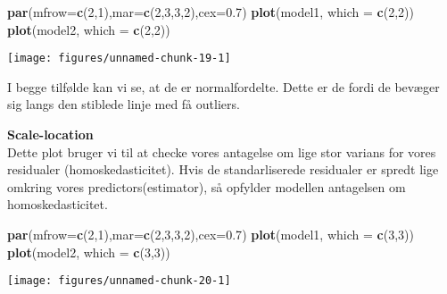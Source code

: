 \documentclass[
  10pt,
]{article}
\newenvironment{Shaded}{\begin{snugshade}}{\end{snugshade}}
\newcommand{\DataTypeTok}[1]{\textcolor[rgb]{0.13,0.29,0.53}{#1}}
\newcommand{\DecValTok}[1]{\textcolor[rgb]{0.00,0.00,0.81}{#1}}
\newcommand{\FloatTok}[1]{\textcolor[rgb]{0.00,0.00,0.81}{#1}}
\newcommand{\KeywordTok}[1]{\textcolor[rgb]{0.13,0.29,0.53}{\textbf{#1}}}
\newcommand{\NormalTok}[1]{#1}
\begin{document}
\begin{Shaded}
\begin{Highlighting}[]
\KeywordTok{par}\NormalTok{(}\DataTypeTok{mfrow=}\KeywordTok{c}\NormalTok{(}\DecValTok{2}\NormalTok{,}\DecValTok{1}\NormalTok{),}\DataTypeTok{mar=}\KeywordTok{c}\NormalTok{(}\DecValTok{2}\NormalTok{,}\DecValTok{3}\NormalTok{,}\DecValTok{3}\NormalTok{,}\DecValTok{2}\NormalTok{),}\DataTypeTok{cex=}\FloatTok{0.7}\NormalTok{)}
\KeywordTok{plot}\NormalTok{(model1, }\DataTypeTok{which =} \KeywordTok{c}\NormalTok{(}\DecValTok{2}\NormalTok{,}\DecValTok{2}\NormalTok{))}
\KeywordTok{plot}\NormalTok{(model2, }\DataTypeTok{which =} \KeywordTok{c}\NormalTok{(}\DecValTok{2}\NormalTok{,}\DecValTok{2}\NormalTok{))}
\end{Highlighting}
\end{Shaded}

\begin{center}\texttt{[image: figures/unnamed-chunk-19-1]} \end{center}

I begge tilfølde kan vi se, at de er normalfordelte. Dette er de fordi
de bevæger sig langs den stiblede linje med få outliers. \newpage

\textbf{Scale-location}\\
Dette plot bruger vi til at checke vores antagelse om lige stor varians
for vores residualer (homoskedasticitet). Hvis de standarliserede
residualer er spredt lige omkring vores predictors(estimator), så
opfylder modellen antagelsen om homoskedasticitet.

\begin{Shaded}
\begin{Highlighting}[]
\KeywordTok{par}\NormalTok{(}\DataTypeTok{mfrow=}\KeywordTok{c}\NormalTok{(}\DecValTok{2}\NormalTok{,}\DecValTok{1}\NormalTok{),}\DataTypeTok{mar=}\KeywordTok{c}\NormalTok{(}\DecValTok{2}\NormalTok{,}\DecValTok{3}\NormalTok{,}\DecValTok{3}\NormalTok{,}\DecValTok{2}\NormalTok{),}\DataTypeTok{cex=}\FloatTok{0.7}\NormalTok{)}
\KeywordTok{plot}\NormalTok{(model1, }\DataTypeTok{which =} \KeywordTok{c}\NormalTok{(}\DecValTok{3}\NormalTok{,}\DecValTok{3}\NormalTok{))}
\KeywordTok{plot}\NormalTok{(model2, }\DataTypeTok{which =} \KeywordTok{c}\NormalTok{(}\DecValTok{3}\NormalTok{,}\DecValTok{3}\NormalTok{))}
\end{Highlighting}
\end{Shaded}

\begin{center}\texttt{[image: figures/unnamed-chunk-20-1]} \end{center}
\end{document}
